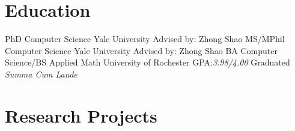 \documentclass[10pt,letterpaper,sans]{moderncv}
\begin{document}
\renewcommand*{\namefont}{\fontsize{20}{24}\mdseries\upshape}
\makecvtitle{}
\vspace{-1cm}

\section{Education}

        {PhD Computer Science}
        {Yale University}
        {}
        {}
        {Advised by: Zhong Shao}
        {MS/MPhil Computer Science}
        {Yale University}
        {}
        {}
        {Advised by: Zhong Shao}
        {BA Computer Science/BS Applied Math}
        {University of Rochester}
        {}
        {GPA:\@ \textit{3.98/4.00}}
        {Graduated \textit{Summa Cum Laude}}

\section{Research Projects}
\end{document}
